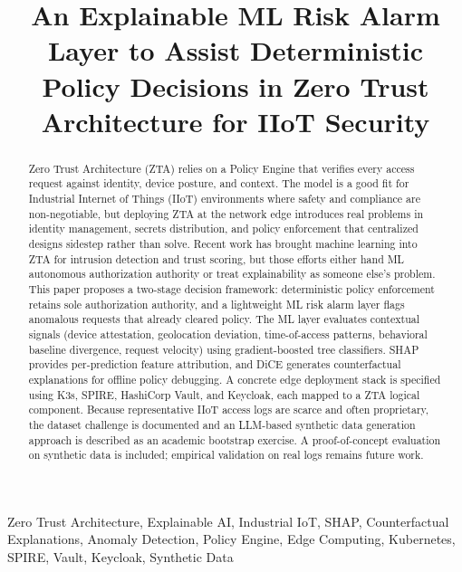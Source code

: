 \documentclass[conference]{IEEEtran}
\begin{document}
\pagestyle{plain}
\title{An Explainable ML Risk Alarm Layer to Assist Deterministic Policy Decisions in Zero Trust Architecture for IIoT Security}

\author{
}

\maketitle
\thispagestyle{plain}

\begin{abstract}
Zero Trust Architecture (ZTA) relies on a Policy Engine that verifies every access request against identity, device posture, and context. The model is a good fit for Industrial Internet of Things (IIoT) environments where safety and compliance are non-negotiable, but deploying ZTA at the network edge introduces real problems in identity management, secrets distribution, and policy enforcement that centralized designs sidestep rather than solve. Recent work has brought machine learning into ZTA for intrusion detection and trust scoring, but those efforts either hand ML autonomous authorization authority or treat explainability as someone else's problem. This paper proposes a two-stage decision framework: deterministic policy enforcement retains sole authorization authority, and a lightweight ML risk alarm layer flags anomalous requests that already cleared policy. The ML layer evaluates contextual signals (device attestation, geolocation deviation, time-of-access patterns, behavioral baseline divergence, request velocity) using gradient-boosted tree classifiers. SHAP provides per-prediction feature attribution, and DiCE generates counterfactual explanations for offline policy debugging. A concrete edge deployment stack is specified using K3s, SPIRE, HashiCorp Vault, and Keycloak, each mapped to a ZTA logical component. Because representative IIoT access logs are scarce and often proprietary, the dataset challenge is documented and an LLM-based synthetic data generation approach is described as an academic bootstrap exercise. A proof-of-concept evaluation on synthetic data is included; empirical validation on real logs remains future work.
\end{abstract}

\begin{IEEEkeywords}
Zero Trust Architecture, Explainable AI, Industrial IoT, SHAP, Counterfactual Explanations, Anomaly Detection, Policy Engine, Edge Computing, Kubernetes, SPIRE, Vault, Keycloak, Synthetic Data
\end{IEEEkeywords}
\end{document}
